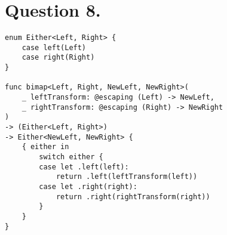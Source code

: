\documentclass{article}
\begin{document}
\section*{Question 8.}

\begin{verbatim}
enum Either<Left, Right> {
	case left(Left)
	case right(Right)
}

func bimap<Left, Right, NewLeft, NewRight>(
	_ leftTransform: @escaping (Left) -> NewLeft,
	_ rightTransform: @escaping (Right) -> NewRight
)
-> (Either<Left, Right>)
-> Either<NewLeft, NewRight> {
	{ either in
		switch either {
		case let .left(left):
			return .left(leftTransform(left))
		case let .right(right):
			return .right(rightTransform(right))
		}
	}
}
\end{verbatim}
\end{document}
